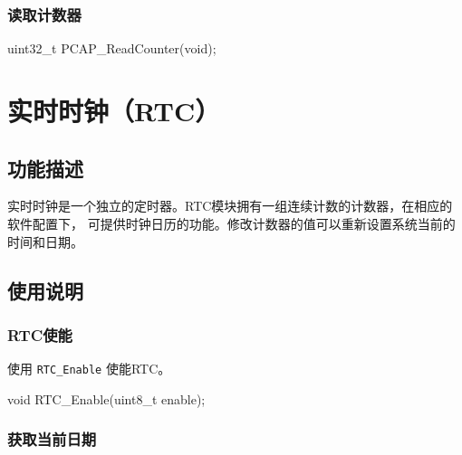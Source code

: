 \documentclass[
  12pt,
]{book}
\newenvironment{Shaded}{\begin{snugshade}}{\end{snugshade}}
\newcommand{\DataTypeTok}[1]{\textcolor[rgb]{0.13,0.29,0.53}{#1}}
\newcommand{\NormalTok}[1]{#1}
\begin{document}
\hypertarget{ux8bfbux53d6ux8ba1ux6570ux5668}{%
\subsection{读取计数器}\label{ux8bfbux53d6ux8ba1ux6570ux5668}}

\begin{Shaded}
\begin{Highlighting}[]
\DataTypeTok{uint32_t}\NormalTok{ PCAP_ReadCounter(}\DataTypeTok{void}\NormalTok{);}
\end{Highlighting}
\end{Shaded}

\hypertarget{ch-rtc}{%
\chapter{实时时钟（RTC）}\label{ch-rtc}}

\hypertarget{ux529fux80fdux63cfux8ff0-3}{%
\section{功能描述}\label{ux529fux80fdux63cfux8ff0-3}}

实时时钟是一个独立的定时器。RTC模块拥有一组连续计数的计数器，在相应的软件配置下，
可提供时钟日历的功能。修改计数器的值可以重新设置系统当前的时间和日期。

\hypertarget{ux4f7fux7528ux8bf4ux660e-3}{%
\section{使用说明}\label{ux4f7fux7528ux8bf4ux660e-3}}

\hypertarget{rtcux4f7fux80fd}{%
\subsection{RTC使能}\label{rtcux4f7fux80fd}}

使用 \texttt{RTC\_Enable} 使能RTC。

\begin{Shaded}
\begin{Highlighting}[]
\DataTypeTok{void}\NormalTok{ RTC_Enable(}\DataTypeTok{uint8_t}\NormalTok{ enable);}
\end{Highlighting}
\end{Shaded}

\hypertarget{ux83b7ux53d6ux5f53ux524dux65e5ux671f}{%
\subsection{获取当前日期}\label{ux83b7ux53d6ux5f53ux524dux65e5ux671f}}
\end{document}
